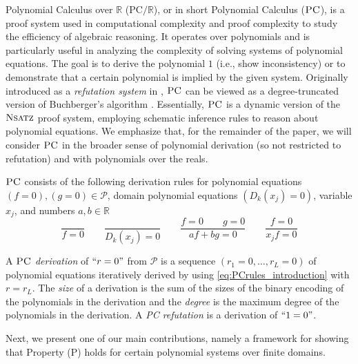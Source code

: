 \documentclass[11pt]{article}
\newcommand{\PC}{\textsc{PC}}
\newcommand{\Nsatz}{\textsc{Nsatz}}
\newcommand{\1}{\textbf{1}}
\begin{document}
Polynomial Calculus over $\mathbb{R}$ ($\textrm{PC}\slash \mathbb{R}$), or in short Polynomial Calculus ($\PC$), is a proof system used in computational complexity and proof complexity to study the efficiency of algebraic reasoning. It operates over polynomials and is particularly useful in analyzing the complexity of solving systems of polynomial equations. The goal is to derive the polynomial \(1\) (i.e., show inconsistency) or to demonstrate that a certain polynomial is implied by the given system. 
Originally introduced as a \textit{refutation system} in \cite{CleggEI96}, $\PC$ can be viewed as a degree-truncated version of Buchberger’s algorithm \cite{JeffersonJGD13, Cox}. Essentially, $\PC$ is a dynamic version of the $\Nsatz$ proof system, employing schematic inference rules to reason about polynomial equations. We emphasize that, for the remainder of the paper, we will consider \(\PC\) in the broader sense of polynomial derivation (so not restricted to refutation) and with polynomials over the reals.

$\PC$ consists of the following derivation rules for polynomial equations $(f = 0), (g = 0) \in  \mathcal{P}$, domain polynomial equations $(D_{k}(x_j)=0)$, variable $x_j$, and numbers $a, b \in \mathbb{R}$
\begin{equation}\label{eq:PCrules_introduction}
    \frac{}{f=0} \qquad \frac{}{D_{k}(x_j)=0} \qquad \frac{f=0 \qquad g=0}{a f + b g =0} \qquad \frac{f=0}{x_jf=0} 
\end{equation}

A \emph{$\PC$ derivation} of $``r=0"$ from $\mathcal{P}$ is a sequence $(r_1=0,\ldots,r_L=0)$ of polynomial equations iteratively derived by using \eqref{eq:PCrules_introduction} with $r=r_L$. The \emph{size} of a derivation is the sum of the sizes of the binary encoding of the polynomials in the derivation and the \emph{degree} is the maximum degree of the polynomials in the derivation. A \emph{PC refutation} is a derivation of $``1=0"$.

Next, we present one of our main contributions, namely a framework for showing that Property (\textsc{P}) holds for certain polynomial systems over finite domains.
\end{document}
